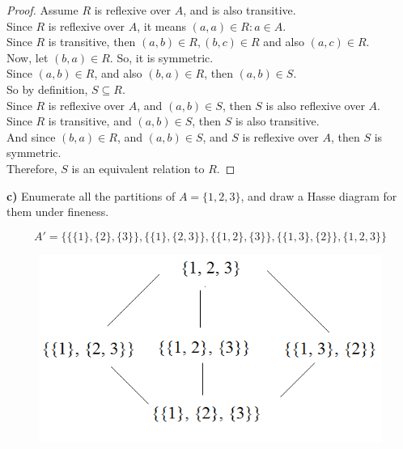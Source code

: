 \documentclass[titlepage, letterpaper, fleqn]{article}
\newcommand{\spacepls}{\vspace{5mm}}
\begin{document}
\begin{proof}
Assume \(R\) is reflexive over \(A\), and is also transitive.\\
Since \(R\) is reflexive over \(A\), it means \((a,a) \in R: a \in A\).\\
Since \(R\) is transitive, then \((a,b) \in R, (b,c) \in R\) and also \((a,c) \in R\).\\
Now, let \((b,a) \in R\). So, it is symmetric.\\
Since \((a,b) \in R\), and also \((b,a) \in R\), then \((a,b) \in S\).\\
So by definition, \(S \subseteq R\).\\
Since \(R\) is reflexive over \(A\), and \((a,b) \in S\), then \(S\) is also reflexive over \(A\).\\
Since \(R\) is transitive, and \((a,b) \in S\), then \(S\) is also transitive.\\
And since \((b,a) \in R\), and \((a,b) \in S\), and \(S\) is reflexive over \(A\), then \(S\) is symmetric.\\
Therefore, \(S\) is an equivalent relation to \(R\).
\end{proof}

\spacepls

{\large \textbf{c)} Enumerate all the partitions of \(A = \{1,2,3\}\), and draw a Hasse diagram for them under fineness.}

\[A' = \{\{\{1\}, \{2\}, \{3\}\}, \{\{1\},\{2,3\}\}, \{\{1,2\},\{3\}\}, \{\{1,3\},\{2\}\}, \{1, 2, 3\}\}\]

\begin{figure}[h]
\includegraphics[width=0.5\linewidth]{hasse}
\centering
\end{figure}
\end{document}

